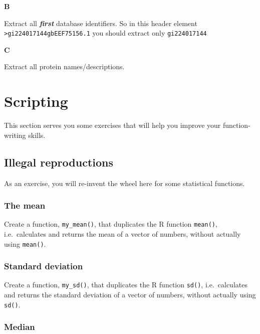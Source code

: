 \documentclass[]{book}
\begin{document}
\textbf{B}

Extract all \textbf{\emph{first}} database identifiers. So in this header element \texttt{\textgreater{}gi\textbar{}224017144\textbar{}gb\textbar{}EEF75156.1\textbar{}} you should extract only \texttt{gi\textbar{}224017144}

\textbf{C}

Extract all protein names/descriptions.

\hypertarget{scripting-1}{%
\section{Scripting}\label{scripting-1}}

This section serves you some exercises that will help you improve your function-writing skills.

\hypertarget{illegal-reproductions}{%
\subsection{Illegal reproductions}\label{illegal-reproductions}}

As an exercise, you will re-invent the wheel here for some statistical functions.

\hypertarget{the-mean}{%
\subsubsection*{The mean}\label{the-mean}}

Create a function, \texttt{my\_mean()}, that duplicates the R function \texttt{mean()}, i.e.~calculates and returns the mean of a vector of numbers, without actually using \texttt{mean()}.

\hypertarget{standard-deviation}{%
\subsubsection*{Standard deviation}\label{standard-deviation}}

Create a function, \texttt{my\_sd()}, that duplicates the R function \texttt{sd()}, i.e.~calculates and returns the standard deviation of a vector of numbers, without actually using \texttt{sd()}.

\hypertarget{median}{%
\subsubsection*{Median}\label{median}}
\end{document}
